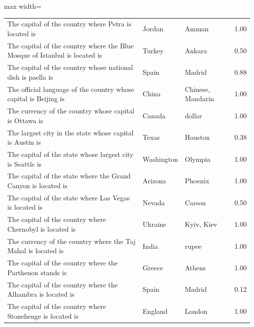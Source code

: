 \begin{table}[t]
\begin{adjustbox}{max width=\textwidth}
\begin{tabular}{p{7.5cm}llr}
The capital of the country where Petra is located is & Jordan & Amman & 1.00 \\
The capital of the country where the Blue Mosque of Istanbul is located is & Turkey & Ankara & 0.50 \\
The capital of the country whose national dish is paella is & Spain & Madrid & 0.88 \\
The official language of the country whose capital is Beijing is & China & Chinese, Mandarin & 1.00 \\
The currency of the country whose capital is Ottawa is & Canada & dollar & 1.00 \\
The largest city in the state whose capital is Austin is & Texas & Houston & 0.38 \\
The capital of the state whose largest city is Seattle is & Washington & Olympia & 1.00 \\
The capital of the state where the Grand Canyon is located is & Arizona & Phoenix & 1.00 \\
The capital of the state where Las Vegas is located is & Nevada & Carson & 0.50 \\
The capital of the country where Chernobyl is located is & Ukraine & Kyiv, Kiev & 1.00 \\
The currency of the country where the Taj Mahal is located is & India & rupee & 1.00 \\
The capital of the country where the Parthenon stands is & Greece & Athens & 1.00 \\
The capital of the country where the Alhambra is located is & Spain & Madrid & 0.12 \\
The capital of the country where Stonehenge is located is & England & London & 1.00 \\
\bottomrule
\end{tabular}
\end{adjustbox}
\end{table}
